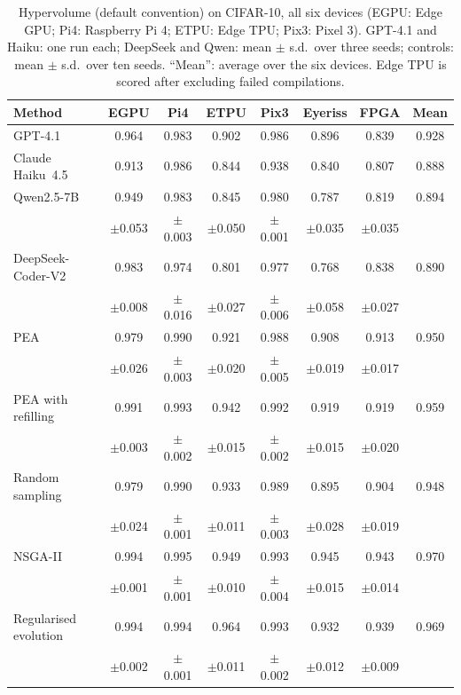 \documentclass[pdflatex,sn-mathphys-ay]{sn-jnl}
\begin{document}
\begin{table}[h]\centering\footnotesize
\caption{Hypervolume (default convention) on CIFAR-10, all six devices (EGPU: Edge GPU; Pi4: Raspberry Pi 4; ETPU: Edge TPU; Pix3: Pixel 3). GPT-4.1 and Haiku: one run each; DeepSeek and Qwen: mean $\pm$ s.d.\ over three seeds; controls: mean $\pm$ s.d.\ over ten seeds. ``Mean'': average over the six devices. Edge TPU is scored after excluding failed compilations.}\label{tab:multidevice}
\setlength{\tabcolsep}{2pt}
\begin{tabular}{lccccccc}
\toprule
Method & EGPU & Pi4 & ETPU & Pix3 & Eyeriss & FPGA & Mean \\
\midrule
GPT-4.1 & 0.964 & 0.983 & 0.902 & 0.986 & 0.896 & 0.839 & 0.928 \\
Claude Haiku~4.5 & 0.913 & 0.986 & 0.844 & 0.938 & 0.840 & 0.807 & 0.888 \\
Qwen2.5-7B & 0.949 & 0.983 & 0.845 & 0.980 & 0.787 & 0.819 & 0.894 \\
 & $\pm$0.053 & $\pm$0.003 & $\pm$0.050 & $\pm$0.001 & $\pm$0.035 & $\pm$0.035 &  \\
DeepSeek-Coder-V2 & 0.983 & 0.974 & 0.801 & 0.977 & 0.768 & 0.838 & 0.890 \\
 & $\pm$0.008 & $\pm$0.016 & $\pm$0.027 & $\pm$0.006 & $\pm$0.058 & $\pm$0.027 &  \\
\midrule
PEA & 0.979 & 0.990 & 0.921 & 0.988 & 0.908 & 0.913 & 0.950 \\
 & $\pm$0.026 & $\pm$0.003 & $\pm$0.020 & $\pm$0.005 & $\pm$0.019 & $\pm$0.017 &  \\
PEA with refilling & 0.991 & 0.993 & 0.942 & 0.992 & 0.919 & 0.919 & 0.959 \\
 & $\pm$0.003 & $\pm$0.002 & $\pm$0.015 & $\pm$0.002 & $\pm$0.015 & $\pm$0.020 &  \\
Random sampling & 0.979 & 0.990 & 0.933 & 0.989 & 0.895 & 0.904 & 0.948 \\
 & $\pm$0.024 & $\pm$0.001 & $\pm$0.011 & $\pm$0.003 & $\pm$0.028 & $\pm$0.019 &  \\
NSGA-II & 0.994 & 0.995 & 0.949 & 0.993 & 0.945 & 0.943 & 0.970 \\
 & $\pm$0.001 & $\pm$0.001 & $\pm$0.010 & $\pm$0.004 & $\pm$0.015 & $\pm$0.014 &  \\
Regularised evolution & 0.994 & 0.994 & 0.964 & 0.993 & 0.932 & 0.939 & 0.969 \\
 & $\pm$0.002 & $\pm$0.001 & $\pm$0.011 & $\pm$0.002 & $\pm$0.012 & $\pm$0.009 &  \\
\bottomrule
\end{tabular}
\end{table}
\end{document}
